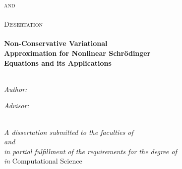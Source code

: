 \documentclass[11pt]{Thesis} %
\begin{document}
\begin{titlepage}
\begin{center}

\textsc{\LARGE \univname \hskip 0.1cm and \\[0cm]   \LARGE \univnamee }\\[1.3cm] %
\textsc{\Large Dissertation}\\[0.2cm] %

\HRule \\[0.3cm] %
{\huge \bfseries Non-Conservative Variational \\[-0.2cm] Approximation for Nonlinear Schr\"{o}dinger  \\[0.3cm] Equations and its Applications} 
\\[0.4cm] %
\HRule \\[1.5cm] %
 
\begin{minipage}{0.4\textwidth}
\begin{flushleft} \large
\emph{Author:}\\
{\authornames} %
\end{flushleft}
\end{minipage}
\begin{minipage}{0.4\textwidth}
\begin{flushright} \large
\emph{Advisor:} \\
\href{http://www-rohan.sdsu.edu/~rcarrete/}
{\supname}
\end{flushright}
\end{minipage}\\[2cm]
 
\large \textit{A dissertation submitted to the faculties of \\[0.2cm] {\univname}  and \univnamee\\[0.2cm] in partial fulfillment of the requirements for the degree of }\\[0.3cm]  {\large \degreename}  \textit{in} \large{Computational Science}\\[2cm] %
 

\end{center}
\end{titlepage}
\end{document}
